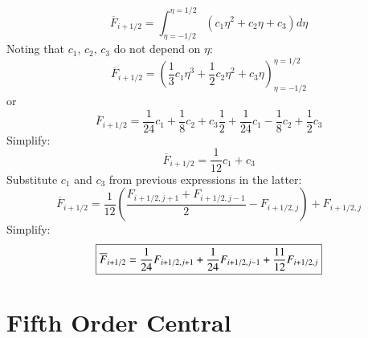 \documentclass{warpdoc}
\newcommand\frameeqn[1]{\fbox{$\displaystyle #1$}}
\begin{document}
%
%
\begin{equation}
\overline{F}_{i+1/2}=\int_{\eta=-1/2}^{\eta=1/2} (c_1 \eta^2 + c_2 \eta + c_3 ) d\eta
\end{equation}
%
Noting that $c_1$, $c_2$, $c_3$ do not depend on $\eta$:
%
\begin{equation}
\overline{F}_{i+1/2}=\left(\frac{1}{3}c_1 \eta^3 + \frac{1}{2} c_2 \eta^2 + c_3 \eta\right)_{\eta=-1/2}^{\eta=1/2} 
\end{equation}
%
or
%
\begin{equation}
\overline{F}_{i+1/2}=\frac{1}{24}c_1  + \frac{1}{8} c_2  + c_3 \frac{1}{2}
+\frac{1}{24}c_1  - \frac{1}{8} c_2  + \frac{1}{2} c_3 
\end{equation}
%
Simplify:
%
\begin{equation}
\overline{F}_{i+1/2}=\frac{1}{12}c_1   + c_3 
\end{equation}
%
Substitute $c_1$ and $c_3$ from previous expressions in the latter:
%
\begin{equation}
\overline{F}_{i+1/2}=\frac{1}{12}\left(\frac{F_{i+1/2,j+1}+F_{i+1/2,j-1}}{2}- F_{i+1/2,j} \right)   + F_{i+1/2,j} 
\end{equation}
%
Simplify:
%
\begin{equation}
\frameeqn{
\overline{F}_{i+1/2}=\frac{1}{24} F_{i+1/2,j+1}+ \frac{1}{24}F_{i+1/2,j-1}   + \frac{11}{12}F_{i+1/2,j} 
}
\label{eqn:Finteg_central3}
\end{equation}
%



\section{Fifth Order Central}
\end{document}
